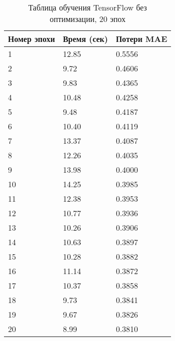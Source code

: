 \documentclass[a4paper,12pt,titlepage,final]{article}
\begin{document}
\begin{table}[H]
\centering
\begin{tabular}{|p{6.4cm}|p{3.2cm}|p{3.2cm}|}
\hline
Номер эпохи & Время (сек) & Потери MAE\\
\hline
1 & 12.85 & 0.5556 \\ [1.5ex]
\hline
2 & 9.72 & 0.4606 \\ [1.5ex]
\hline
3 & 9.83 & 0.4365 \\ [1.5ex]
\hline
4 & 10.48 & 0.4258 \\ [1.5ex]
\hline
5 & 9.48 & 0.4187 \\ [1.5ex]
\hline
6 & 10.40 & 0.4119 \\ [1.5ex]
\hline
7 & 13.37 & 0.4087 \\ [1.5ex]
\hline
8 & 12.26 & 0.4035 \\ [1.5ex]
\hline
9 & 13.98 & 0.4000 \\ [1.5ex]
\hline
10 & 14.25 & 0.3985 \\ [1.5ex]
\hline
11 & 12.38 & 0.3953 \\ [1.5ex]
\hline
12 & 10.77 & 0.3936 \\ [1.5ex]
\hline
13 & 10.26 & 0.3906 \\ [1.5ex]
\hline
14 & 10.63 & 0.3897 \\ [1.5ex]
\hline
15 & 10.28 & 0.3882 \\ [1.5ex]
\hline
16 & 11.14 & 0.3872 \\ [1.5ex]
\hline
17 & 10.37 & 0.3858 \\ [1.5ex]
\hline
18 & 9.73 & 0.3841 \\ [1.5ex]
\hline
19 & 9.67 & 0.3826 \\ [1.5ex]
\hline
20 & 8.99 & 0.3810 \\ [1.5ex]
\hline
\end{tabular}
\caption{Таблица обучения TensorFlow без оптимизации, 20 эпох}
\label{table2}
\end{table}
\end{document}

